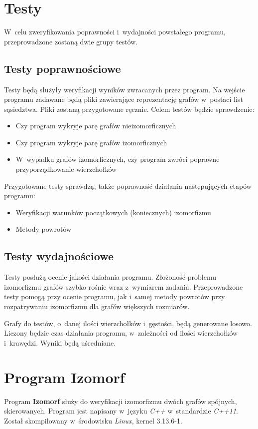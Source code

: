 \documentclass[12pt, a4paper, ]{article} %
\begin{document}
\section{Testy}
W~celu zweryfikowania poprawności i~wydajności powstałego programu, przeprowadzone zostaną
dwie grupy testów.
\subsection{Testy poprawnościowe}
Testy będą służyły weryfikacji wyników zwracanych przez program. Na wejście programu zadawane
będą pliki zawierające reprezentację grafów w~postaci list sąsiedztwa. Pliki zostaną przygotowane
ręcznie. Celem testów będzie sprawdzenie:
\begin{itemize}
  \item Czy program wykryje parę grafów nieizomorficznych
  \item Czy program wykryje parę grafów izomorficznych
  \item W~wypadku grafów izomorficznych, czy program zwróci poprawne
    przyporządkowanie wierzchołków
\end{itemize}
Przygotowane testy sprawdzą, także poprawność działania następujących etapów programu:
\begin{itemize}
  \item Weryfikacji warunków początkowych (koniecznych) izomorfizmu
  \item Metody powrotów
\end{itemize}


\subsection{Testy wydajnościowe}
Testy posłużą ocenie jakości działania programu. Złożoność problemu izomorfizmu
grafów szybko rośnie wraz z~wymiarem zadania. Przeprowadzone testy pomogą przy ocenie
programu, jak i~samej metody powrotów przy rozpatrywaniu izomorfizmu dla grafów
większych rozmiarów.

Grafy do testów, o~danej ilości wierzchołków i~gęstości, będą generowane losowo.
Liczony będzie czas działania programu, w~zależności od ilości wierzchołków i~krawędzi.
Wyniki będą uśredniane.

\section{Program Izomorf}
Program \textbf{Izomorf} służy do weryfikacji izomorfizmu dwóch grafów spójnych, skierowanych.
Program jest napisany w~języku \textit{C++} w~standardzie \textit{C++11}. Został skompilowany
w~środowisku \textit{Linux}, kernel 3.13.6-1.
\end{document}
